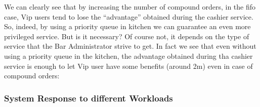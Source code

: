 We can clearly see that by increasing the number of compound orders, in the fifo case, Vip users tend to lose the ``advantage'' obtained during the cashier service. So, indeed, by using a priority queue in kitchen we can guarantee an even more privileged service. But is it necessary? Of course not, it depends on the type of service that the Bar Administrator strive to get. In fact we see that even without using a priority queue in the kitchen, the advantage obtained during tha cashier service is enough to let Vip user have some benefits (around 2m) even in case of compound orders:


\subsubsection{System Response to different Workloads}

